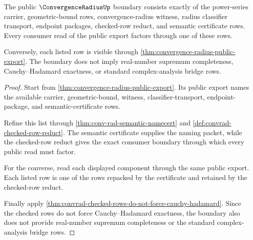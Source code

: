 \begin{theorem}
\label{thm:convergence-radius-public-boundary-exactness}
The public $\ConvergenceRadiusUp$ boundary consists exactly of the
power-series carrier, geometric-bound rows, convergence-radius witness, radius
classifier transport, endpoint packages, checked-row reduct, and semantic
certificate rows. Every consumer read of the public export factors through
one of these rows.

Conversely, each listed row is visible through
\autoref{thm:convergence-radius-public-export}. The boundary does not imply
real-number supremum completeness, Cauchy--Hadamard exactness, or standard
complex-analysis bridge rows.
\end{theorem}
\begin{proof}
Start from \autoref{thm:convergence-radius-public-export}. Its public export
names the available carrier, geometric-bound, witness, classifier-transport,
endpoint-package, and semantic-certificate rows.

Refine this list through \autoref{thm:conv-rad-semantic-namecert} and
\autoref{def:convrad-checked-row-reduct}. The semantic certificate supplies
the naming packet, while the checked-row reduct gives the exact consumer
boundary through which every public read must factor.

For the converse, read each displayed component through the same public export.
Each listed row is one of the rows repacked by the certificate and retained by
the checked-row reduct.

Finally apply
\autoref{thm:convrad-checked-rows-do-not-force-cauchy-hadamard}. Since the
checked rows do not force Cauchy--Hadamard exactness, the boundary also does
not provide real-number supremum completeness or the standard
complex-analysis bridge rows.
\end{proof}

